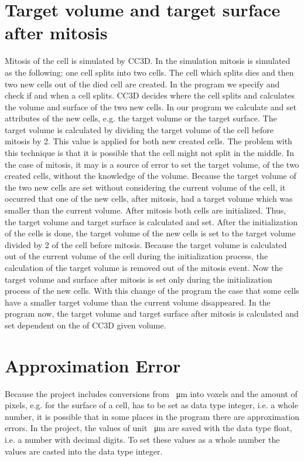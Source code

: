 \section{Target volume and target surface after mitosis}
Mitosis of the cell is simulated by \ac{CC3D}. In the simulation mitosis is simulated as the following: one cell splits into two cells. The cell which splits dies and then two new cells out of the died cell are created. \newline
In the program we specify and check if and when a cell splits. \ac{CC3D} decides where the cell splits and calculates the volume and surface of the two new cells. In our program we calculate and set attributes of the new cells, e.g. the target volume or the target surface. \newline 
The target volume is calculated by dividing the target volume of the cell before mitosis by 2. This value is applied for both new created cells. The problem with this technique is that it is possible that the cell might not split in the middle. In the case of mitosis, it may is a source of error to set the target volume, of the two created cells, without the knowledge of the volume. Because the target volume of the two new cells are set without considering the current volume of the cell, it occurred that one of the new cells, after mitosis, had a target volume which was smaller than the current volume. \newline
After mitosis both cells are initialized. Thus, the target volume and target surface is calculated and set. After the initialization of the cells is done, the target volume of the new cells is set to the target volume divided by 2 of the cell before mitosis. \newline
Because the target volume is calculated out of the current volume of the cell during the initialization process, the calculation of the target volume is removed out of the mitosis event. Now the target volume and surface after mitosis is set only during the initialization process of the new cells. \newline
With this change of the program the case that some cells have a smaller target volume than the current volume disappeared. In the program now, the target volume and target surface after mitosis is calculated and set dependent on the of \ac{CC3D} given volume.



\section{Approximation Error}
Because the project includes conversions from \SI{}{\micro\metre} into voxels and the amount of pixels, e.g. for the surface of a cell, has to be set as data type integer, i.e. a whole number, it is possible that in some places in the program there are approximation errors. In the project, the values of unit \SI{}{\micro\metre} are saved with the data type float, i.e. a number with decimal digits. To set these values as a whole number the values are casted into the data type integer. 

